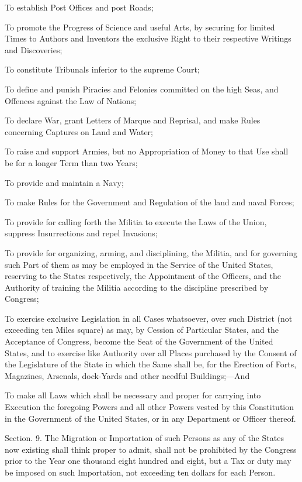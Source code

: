 \documentclass{article}
\begin{document}
To establish Post Offices and post Roads;

To promote the Progress of Science and useful Arts, by securing for limited
Times to Authors and Inventors the exclusive Right to their respective Writings
and Discoveries;

To constitute Tribunals inferior to the supreme Court;

To define and punish Piracies and Felonies committed on the high Seas, and
Offences against the Law of Nations;

To declare War, grant Letters of Marque and Reprisal, and make Rules concerning
Captures on Land and Water;

To raise and support Armies, but no Appropriation of Money to that Use shall be
for a longer Term than two Years;

To provide and maintain a Navy;

To make Rules for the Government and Regulation of the land and naval Forces;

To provide for calling forth the Militia to execute the Laws of the Union,
suppress Insurrections and repel Invasions;

To provide for organizing, arming, and disciplining, the Militia, and for
governing such Part of them as may be employed in the Service of the United
States, reserving to the States respectively, the Appointment of the Officers,
and the Authority of training the Militia according to the discipline prescribed
by Congress;

To exercise exclusive Legislation in all Cases whatsoever, over such District
(not exceeding ten Miles square) as may, by Cession of Particular States, and
the Acceptance of Congress, become the Seat of the Government of the United
States, and to exercise like Authority over all Places purchased by the Consent
of the Legislature of the State in which the Same shall be, for the Erection of
Forts, Magazines, Arsenals, dock-Yards and other needful Buildings;—And

To make all Laws which shall be necessary and proper for carrying into Execution
the foregoing Powers and all other Powers vested by this Constitution in the
Government of the United States, or in any Department or Officer thereof.


Section. 9.  The Migration or Importation of such Persons as any of the States
now existing shall think proper to admit, shall not be prohibited by the
Congress prior to the Year one thousand eight hundred and eight, but a Tax or
duty may be imposed on such Importation, not exceeding ten dollars for each
Person.
\end{document}

